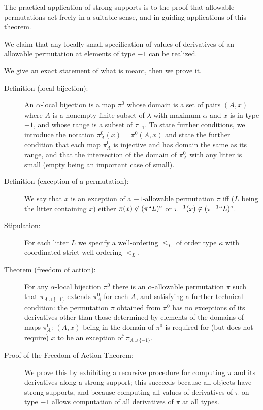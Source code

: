 The practical application of strong supports is to the proof that allowable permutations act freely in a suitable sense, and in guiding applications of this theorem.

We claim that any locally small specification of values of derivatives of an allowable permutation at elements of type $-1$ can be realized.

We give an exact statement of what is meant, then we prove it.

\begin{description}

\item[Definition (local bijection):]  An $\alpha$-local bijection is a map $\pi^0$ whose domain is a set of pairs $(A,x)$ where $A$ is a nonempty finite subset of $\lambda$ with maximum $\alpha$ and $x$ is in type $-1$,  and whose range is a subset of $\tau_{-1}$.  To state further conditions, we introduce the notation $\pi^0_A(x) = \pi^0(A,x)$ and state the further condition that each map $\pi^0_A$ is injective and has domain the same as its range, and that the intersection of the domain of $\pi^0_A$ with any litter is small (empty being an important case of small).

\item[Definition (exception of a permutation):]  We say that $x$ is an exception of a $-1$-allowable permutation $\pi$ iff ($L$ being the litter containing $x$) either $\pi(x) \not\in (\pi``L)^\circ$ or $\pi^{-1}(x) \not\in ({\pi^{-1}}``L)^\circ$.

\item[Stipulation:]  For each litter $L$ we specify a well-ordering $\leq_L$ of order type $\kappa$ with coordinated strict well-ordering $<_L$.

\item[Theorem (freedom of action):]  For any $\alpha$-local bijection $\pi^0$ there is an $\alpha$-allowable permutation $\pi$ such that
$\pi_{A\cup \{-1\}}$ extends $\pi^0_A$ for each $A$, and satisfying a further technical condition:    the permutation $\pi$ obtained from $\pi^0$ has no exceptions of its derivatives other than those determined by elements of the domains of maps $\pi^0_A$:  $(A,x)$ being in the domain of $\pi^0$ is required for (but does not require) $x$ to be an exception of $\pi_{A \cup \{-1\}}$.

\item[Proof of the Freedom of Action Theorem:]  We prove this by exhibiting a recursive procedure for computing $\pi$ and its derivatives along a strong support;  this succeeds because all objects have
strong supports, and because computing all values of derivatives of $\pi$ on type $-1$ allows computation of all derivatives of $\pi$ at all types.


\end{description}
